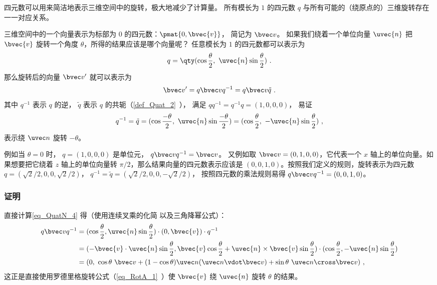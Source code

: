 

四元数可以用来简洁地表示三维空间中的旋转，极大地减少了计算量。 所有模长为 $1$ 的四元数 $q$ 与所有可能的（绕原点的）三维旋转存在一一对应关系。

三维空间中的一个向量表示为标部为 $0$ 的四元数：$\pmat{0, \bvec{v}}$， 简记为 $\bvec v$。 如果我们绕着一个单位向量 ${\uvec{n}}$ 把 $\bvec{v}$ 旋转一个角度 $\theta$，所得的结果应该是哪个向量呢？ 任意模长为 $1$ 的四元数都可以表示为
\begin{equation}
q = \qty(\cos{\frac{\theta}{2}},\ {\uvec{n}}\sin{\frac{\theta}{2}})~.
\end{equation}
那么旋转后的向量 $\bvec v'$ 就可以表示为
\begin{equation}\label{eq_QuatN_4}
\bvec v' = q\bvec vq^{-1} = q\bvec v \tilde q~.
\end{equation}
其中 $q^{-1}$ 表示 $q$ 的逆， $\tilde q$ 表示 $q$ 的共轭（\autoref{def_Quat_2}~）， 满足 $qq^{-1} = q^{-1}q = (1,0,0,0)$， 易证
\begin{equation}
q^{-1} = \tilde q = (\cos{\frac{-\theta}{2}},\ {\uvec{n}}\sin{\frac{-\theta}{2}})
= (\cos{\frac{\theta}{2}},\ -{\uvec{n}}\sin{\frac{\theta}{2}})~,
\end{equation}
表示绕 $\uvec n$ 旋转 $-\theta$。

例如当 $\theta = 0$ 时， $q = (1,0,0,0)$ 是单位元， $q\bvec vq^{-1} = \bvec v$。 又例如取 $\bvec v = (0, 1, 0, 0)$，它代表一个 $x$ 轴上的单位向量。如果想要把它绕着 $z$ 轴上的单位向量转 $\pi/2$，那么结果向量的四元数表示应该是 $(0, 0, 1, 0)$。按照我们定义的规则，旋转表示为四元数 $q=(\sqrt{2}/2, 0, 0, \sqrt{2}/2)$， $q^{-1} = \tilde q = (\sqrt{2}/2,0,0,-\sqrt{2}/2)$， 按照四元数的乘法规则易得 $q\bvec v q^{-1}=(0,0,1,0)$。

\subsubsection{证明}
直接计算\autoref{eq_QuatN_4} 得（使用连续叉乘的化简 以及三角降幂公式）：
\begin{equation}
\begin{aligned}
q\bvec vq^{-1}&= (\cos{\frac{\theta}{2}}, {\uvec{n}}\sin{\frac{\theta}{2}})\cdot (0, \bvec{v})\cdot q^{-1}\\&
=(-\bvec{v}\cdot {\uvec{n}}\sin{\frac{\theta}{2}}, \bvec{v}\cos{\frac{\theta}{2}}+ {\uvec{n}}\times\bvec{v}\sin{\frac{\theta}{2}})\cdot (\cos{\frac{\theta}{2}}, -{\uvec{n}}\sin{\frac{\theta}{2}})\\&
= (0,\ \cos\theta\ \bvec v + (1-\cos\theta)\uvec n(\uvec n\vdot \bvec v) + \sin\theta\ \uvec n\cross\bvec v)~,
\end{aligned}
\end{equation}
这正是直接使用罗德里格旋转公式（\autoref{eq_RotA_1}~）使 $\bvec{v}$ 绕 ${\uvec{n}}$ 旋转 $\theta$ 的结果。

